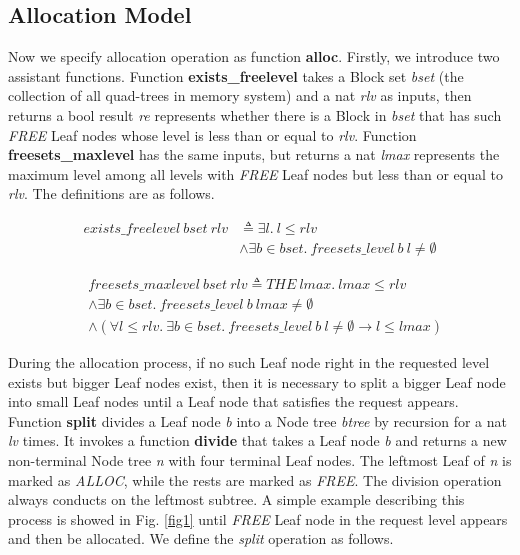 \subsection{Allocation Model}
Now we specify allocation operation as function \textbf{alloc}. Firstly, we introduce two assistant functions. Function \textbf{exists\_freelevel} takes a Block set \emph{bset} (the collection of all quad-trees in memory system) and a nat \emph{rlv} as inputs, then returns a bool result \emph{re} represents whether there is a Block in \emph{bset} that has such \emph{FREE} Leaf nodes whose level is less than or equal to \emph{rlv}. Function \textbf{freesets\_maxlevel} has the same inputs, but returns a nat \emph{lmax} represents the maximum level among all levels with \emph{FREE} Leaf nodes but less than or equal to \emph{rlv}. The definitions are as follows.

\begin{definition} 
\end{definition}
\vspace{-7pt}
{\footnotesize
\begin{align*}
exists\_freelevel\ bset\ rlv &\triangleq \exists l.\ l \leq rlv \\
&\wedge \exists b \in bset.\ freesets\_level\ b\ l \ne \emptyset
\end{align*}
}
\vspace{-12pt}

\begin{definition} 
\end{definition}
\vspace{-7pt}	
{\footnotesize
\begin{align*}
&freesets\_maxlevel\ bset\ rlv \triangleq THE\ lmax.\ lmax \leq rlv \\
&\wedge \exists b \in bset.\ freesets\_level\ b\ lmax \neq \emptyset \\
&\wedge (\forall l \leq rlv.\ \exists b \in bset.\ freesets\_level\ b\ l \ne \emptyset \longrightarrow l \leq lmax)
\end{align*}
}
\vspace{-12pt}

During the allocation process, if no such Leaf node right in the requested level exists but bigger Leaf nodes exist, then it is necessary to split a bigger Leaf node into small Leaf nodes until a Leaf node that satisfies the request appears. Function \textbf{split} divides a Leaf node \emph{b} into a Node tree \emph{btree} by recursion for a nat \emph{lv} times. It invokes a function \textbf{divide} that takes a Leaf node \emph{b} and returns a new non-terminal Node tree \emph{n} with four terminal Leaf nodes. The leftmost Leaf of \emph{n} is marked as \emph{ALLOC}, while the rests are marked as \emph{FREE}. The division operation always conducts on the leftmost subtree. A simple example describing this process is showed in Fig. \ref{fig1} until \emph{FREE} Leaf node in the request level appears and then be allocated. We define the \emph{split} operation as follows.

